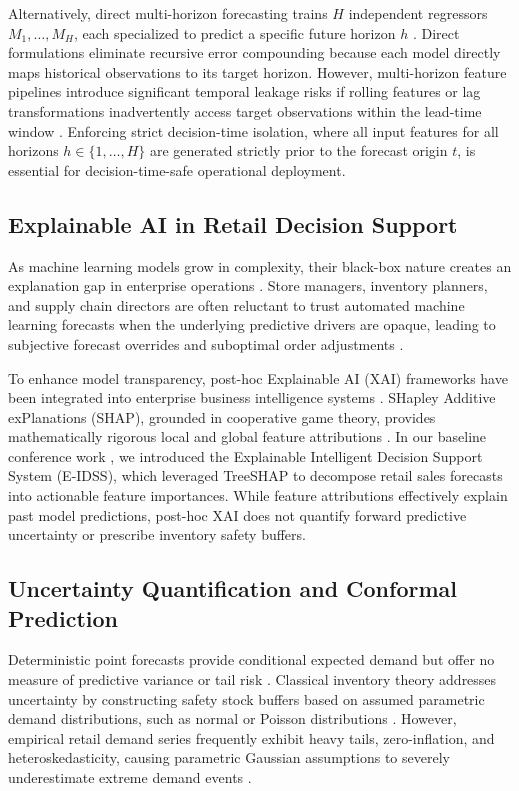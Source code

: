 Alternatively, direct multi-horizon forecasting trains $H$ independent regressors $M_1,\dots,M_H$, each specialized to predict a specific future horizon $h$ \cite{tiwari2026explainable}. Direct formulations eliminate recursive error compounding because each model directly maps historical observations to its target horizon. However, multi-horizon feature pipelines introduce significant temporal leakage risks if rolling features or lag transformations inadvertently access target observations within the lead-time window \cite{tiwari2026explainable}. Enforcing strict decision-time isolation, where all input features for all horizons $h \in \{1,\dots,H\}$ are generated strictly prior to the forecast origin $t$, is essential for decision-time-safe operational deployment.

\subsection{Explainable AI in Retail Decision Support}
As machine learning models grow in complexity, their black-box nature creates an explanation gap in enterprise operations \cite{lin2026critical}. Store managers, inventory planners, and supply chain directors are often reluctant to trust automated machine learning forecasts when the underlying predictive drivers are opaque, leading to subjective forecast overrides and suboptimal order adjustments \cite{chaganti2026, chang2025explainable}.

To enhance model transparency, post-hoc Explainable AI (XAI) frameworks have been integrated into enterprise business intelligence systems \cite{narlawar2025explainable, madabhushini2025}. SHapley Additive exPlanations (SHAP), grounded in cooperative game theory, provides mathematically rigorous local and global feature attributions \cite{lundberg2017unified}. In our baseline conference work \cite{e_idss_ieee}, we introduced the Explainable Intelligent Decision Support System (E-IDSS), which leveraged TreeSHAP to decompose retail sales forecasts into actionable feature importances. While feature attributions effectively explain past model predictions, post-hoc XAI does not quantify forward predictive uncertainty or prescribe inventory safety buffers.

\subsection{Uncertainty Quantification and Conformal Prediction}
Deterministic point forecasts provide conditional expected demand but offer no measure of predictive variance or tail risk \cite{gneiting2007strictly}. Classical inventory theory addresses uncertainty by constructing safety stock buffers based on assumed parametric demand distributions, such as normal or Poisson distributions \cite{silver1998inventory, axsaeter2015inventory}. However, empirical retail demand series frequently exhibit heavy tails, zero-inflation, and heteroskedasticity, causing parametric Gaussian assumptions to severely underestimate extreme demand events \cite{syntetos2016supply}.

